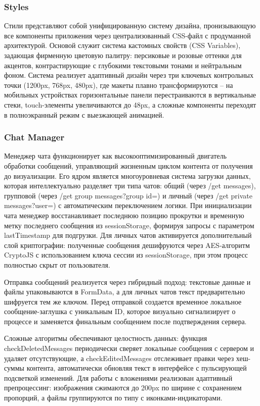 \subsubsection{Styles}
Стили представляют собой унифицированную систему дизайна, пронизывающую все компоненты приложения через централизованный CSS-файл с продуманной архитектурой. Основой служит система кастомных свойств (CSS Variables), задающая фирменную цветовую палитру: персиковые и розовые оттенки для акцентов, контрастирующие с глубокими текстовыми тонами и нейтральным фоном. Система реализует адаптивный дизайн через три ключевых контрольных точки (1200px, 768px, 480px), где макеты плавно трансформируются – на мобильных устройствах горизонтальные панели перестраиваются в вертикальные стеки, touch-элементы увеличиваются до 48px, а сложные компоненты переходят в полноэкранный режим с выезжающей анимацией.

\subsubsection{Chat Manager}

Менеджер чата функционирует как высокооптимизированный двигатель обработки сообщений, управляющий жизненным циклом контента от получения до визуализации. Его ядром является многоуровневая система загрузки данных, которая интеллектуально разделяет три типа чатов: общий (через /get messages), групповой (через /get group messages?group id=) и личный (через /get private messages?user=) с автоматическим переключением логики. При инициализации чата менеджер восстанавливает последнюю позицию прокрутки и временную метку последнего сообщения из sessionStorage, формируя запросы с параметром lastTimestamp для подгрузки. Для личных чатов активируется дополнительный слой криптографии: полученные сообщения дешифруются через AES-алгоритм CryptoJS с использованием ключа сессии из sessionStorage, при этом процесс полностью скрыт от пользователя.

Отправка сообщений реализуется через гибридный подход: текстовые данные и файлы упаковываются в FormData, а для личных чатов текст предварительно шифруется тем же ключом. Перед отправкой создается временное локальное сообщение-заглушка с уникальным ID, которое визуально сигнализирует о процессе и заменяется финальным сообщением после подтверждения сервера.

Сложные алгоритмы обеспечивают целостность данных: функция checkDeletedMessages периодически сверяет локальные сообщения с сервером и удаляет отсутствующие, а checkEditedMessages отслеживает правки через хеш-суммы контента, автоматически обновляя текст в интерфейсе с пульсирующей подсветкой изменений. Для работы с вложениями реализован адаптивный препроцессинг: изображения сжимаются до 200px по ширине с сохранением пропорций, а файлы группируются по типу с иконками-индикаторами. 

